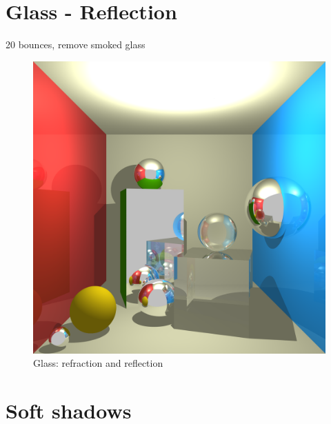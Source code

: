 \section{Glass - Reflection}
20 bounces, remove smoked glass
\begin{figure}[H]
\centering
\includegraphics[width=0.35\linewidth]{img/glass_awesome.png}
\caption{Glass: refraction and reflection}
\end{figure}


\section{Soft shadows}
